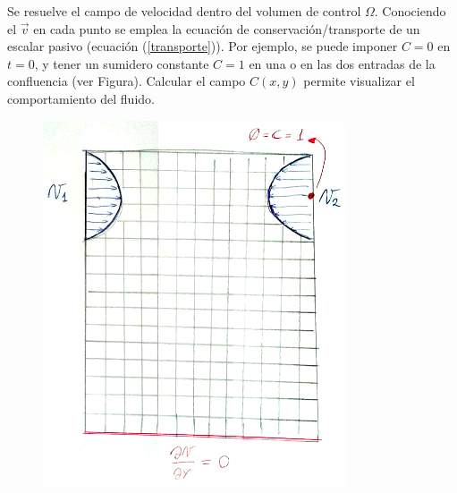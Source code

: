 Se resuelve el campo de velocidad dentro del volumen de control $\Omega$. Conociendo el $\vec{v}$ en cada punto se emplea la ecuación de conservación/transporte de un escalar pasivo (ecuación (\ref{transporte})). Por ejemplo, se puede imponer $C=0$ en $t=0$, y tener un sumidero constante $C=1$ en una o en las dos entradas de la confluencia (ver Figura). Calcular el campo $C(x,y)$ permite visualizar el comportamiento del fluido.

\begin{figure}[H]
\centering
\includegraphics[width=0.8\textwidth]{f3.png}
\caption{ } \label{f3}
\end{figure}